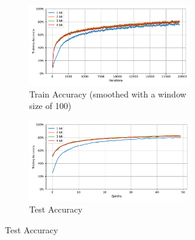         \begin{figure}[H]
            \centering
            \begin{subfigure}[H]{0.69\textwidth}
                \centering
                \begin{subfigure}[H]{\textwidth}
                    \centering
                    \includegraphics[width=\textwidth]{../standard/CIFAR10/plots/cifar10_train_acc.pdf}
                    \caption{Train Accuracy (smoothed with a window size of 100)}
                \end{subfigure}
                \hfill
                \begin{subfigure}[H]{\textwidth}
                    \centering
                    \includegraphics[width=\textwidth]{../standard/CIFAR10/plots/cifar10_test_acc.pdf}
                    \caption{Test Accuracy}
                \end{subfigure}
            \end{subfigure}
            \hfill
            \begin{subfigure}[H]{0.3\textwidth}
                \centering

\end{subfigure}
\end{figure}

